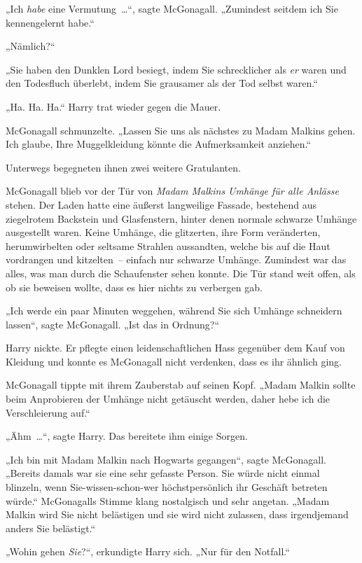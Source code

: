 {„Ich \emph{habe} eine Vermutung~…“, sagte McGonagall. „Zumindest seitdem ich Sie kennengelernt habe.“

„Nämlich?“

„Sie haben den Dunklen Lord besiegt, indem Sie schrecklicher als \emph{er} waren und den Todesfluch überlebt, indem Sie grausamer als der Tod selbst waren.“

„Ha. Ha. Ha.“ Harry trat wieder gegen die Mauer.

McGonagall schmunzelte. „Lassen Sie uns als nächstes zu Madam Malkins gehen. Ich glaube, Ihre Muggelkleidung könnte die Aufmerksamkeit anziehen.“

Unterwegs begegneten ihnen zwei weitere Gratulanten.

McGonagall blieb vor der Tür von \emph{Madam Malkins Umhänge für alle Anlässe} stehen. Der Laden hatte eine äußerst langweilige Fassade, bestehend aus ziegelrotem Backstein und Glasfenstern, hinter denen normale schwarze Umhänge ausgestellt waren. Keine Umhänge, die glitzerten, ihre Form veränderten, herumwirbelten oder seltsame Strahlen aussandten, welche bis auf die Haut vordrangen und kitzelten~-- einfach nur schwarze Umhänge. Zumindest war das alles, was man durch die Schaufenster sehen konnte. Die Tür stand weit offen, als ob sie beweisen wollte, dass es hier nichts zu verbergen gab.

„Ich werde ein paar Minuten weggehen, während Sie sich Umhänge schneidern lassen“, sagte McGonagall. „Ist das in Ordnung?“

Harry nickte. Er pflegte einen leidenschaftlichen Hass gegenüber dem Kauf von Kleidung und konnte es McGonagall nicht verdenken, dass es ihr ähnlich ging.

McGonagall tippte mit ihrem Zauberstab auf seinen Kopf. „Madam Malkin sollte beim Anprobieren der Umhänge nicht getäuscht werden, daher hebe ich die Verschleierung auf.“

„Ähm~…“, sagte Harry. Das bereitete ihm einige Sorgen.

„Ich bin mit Madam Malkin nach Hogwarts gegangen“, sagte McGonagall. „Bereits damals war sie eine sehr gefasste Person. Sie würde nicht einmal blinzeln, wenn Sie-wissen-schon-wer höchstpersönlich ihr Geschäft betreten würde.“ McGonagalls Stimme klang nostalgisch und sehr angetan. „Madam Malkin wird Sie nicht belästigen und sie wird nicht zulassen, dass irgendjemand anders Sie belästigt.“

„Wohin gehen \emph{Sie}?“, erkundigte Harry sich. „Nur für den Notfall.“

}
